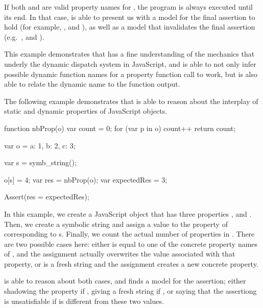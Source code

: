 If both  and  are valid property names for , the program is always executed until its end.
In that case, \cosette is able to present us with a model for the final assertion to hold (for example, , and ), as well as a model that invalidates the final assertion (e.g.~,  and ).

This example demonstrates that \cosette has a fine understanding of the mechanics that underly the dynamic dispatch system in JavaScript, and is able to not only infer possible dynamic function names for a property function call to work, but is also able to relate the dynamic name to the function output.


The following example demonstrates that \cosette is able to reason about the interplay of static and dynamic properties of JavaScript objects.

\begin{lstjshere}
function nbProp(o) {
  var count = 0;
  for (var p in o) { count++ }
  return count;
}

var o = {a: 1, b: 2, c: 3};

var s = symb_string();

o[s] = 4;
var res = nbProp(o);
var expectedRes = 3;

Assert(res = expectedRes);
\end{lstjshere}

In this example, we create a JavaScript object  that has three properties , and .
Then, we create a symbolic string  and assign a value to the property of  corresponding to {s}.
Finally, we count the actual number of properties in .
There are two possible cases here: either  is equal to one of the concrete property names of , and the assignment actually overwrites the value associated with that property, or  is a fresh string and the assignment creates a new concrete property.

\cosette is able to reason about both cases, and finds a model for the assertion; either shadowing the property if , giving a fresh string if , or saying that the assertiong is unsatisfiable if  is different from these two values.


